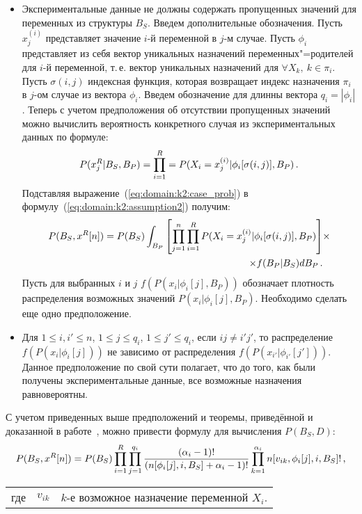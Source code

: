 \begin{itemize}
  \item
  Экспериментальные данные не должны содержать пропущенных значений для переменных из структуры $B_S$.
  Введем дополнительные обозначения.
  Пусть $x_j^{(i)}$ представляет значение $i$-й переменной в $j$-м случае.
  Пусть $\phi_i$ представляет из себя вектор уникальных назначений переменных"=родителей для $i$-й переменной, т.\,е. вектор уникальных назначений для $ \forall X_k,\ k \in \pi_i$.
  Пусть $\sigma(i, j)$ индексная функция, которая возвращает индекс назначения $\pi_i$ в $j$-ом случае из вектора $\phi_i$.
  Введем обозначение для длинны вектора $q_i = | \phi_i |$.
  Теперь с учетом предположения об отсутствии пропущенных значений можно вычислить вероятность конкретного случая из экспериментальных данных по формуле:
  \begin{equation}
    \label{eq:domain:k2:case_prob}
    P(x^R_j | B_S, B_P) =
      \prod_{i = 1}^{R} = P(X_i = x_j^{(i)} | \phi_i[\sigma(i, j)], B_P) \text{\,.}
  \end{equation}
  Подставляя выражение~(\ref{eq:domain:k2:case_prob}) в формулу~(\ref{eq:domain:k2:assumption2}) получим:
  \begin{align}
    \label{eq:domain:k2:assumption3}
    P(B_S, x^R[n]) =
      P(B_S)
      \int_{B_P}\left[ \prod_{j = 1}^{n}\prod_{i = 1}^{R} P(X_i = x_j^{(i)} | \phi_i[\sigma(i, j)], B_P)  \right] &\times \notag\\
      \times f(B_P | B_S) dB_P \text{\,.}
  \end{align}
  Пусть для выбранных $i$ и $j$ $f(P(x_i | \phi_i[j], B_P))$ обозначает плотность распределения возможных значений $P(x_i | \phi_i[j], B_P)$.
  Необходимо сделать еще одно предположение.

  \item Для $ 1 \le i, i' \le n$, $ 1 \le j \le q_i $, $1 \le j' \le q_i $, если
  $ij \neq i'j'$, то распределение $f(P(x_i | \phi_i[j]))$ не зависимо от распределения $f(P(x_{i'} | \phi_{i'}[{j'}]))$.
  Данное предположение по свой сути полагает, что до того, как были получены экспериментальные данные, все возможные назначения равновероятны.
\end{itemize}

С учетом приведенных выше предположений и теоремы, приведённой и доказанной в работе~\cite{Cooper1991}, можно привести формулу для вычисления $P(B_S, D)$:
\begin{equation}
  \label{eq:domain:k2:model_and_data_prob}
  P(B_S, x^R[n]) =
    P(B_S)
    \prod_{i = 1}^{R}
    \prod_{j = 1}^{q_i}
    \frac{(\alpha_i - 1)!}
         {(n[\phi_i[j], i, B_S] + \alpha_i - 1)!}
    \prod_{k = 1}^{\alpha_i}
      n[v_{ik}, \phi_i[j], i, B_S]! \text{\,,}
\end{equation}
\par
\begin{tabular}{@{}ll@{ --- }p{}}
где & $ v_{ik} $ & $k$-е возможное назначение переменной $X_i$. \\[\parsep]
\end{tabular}

